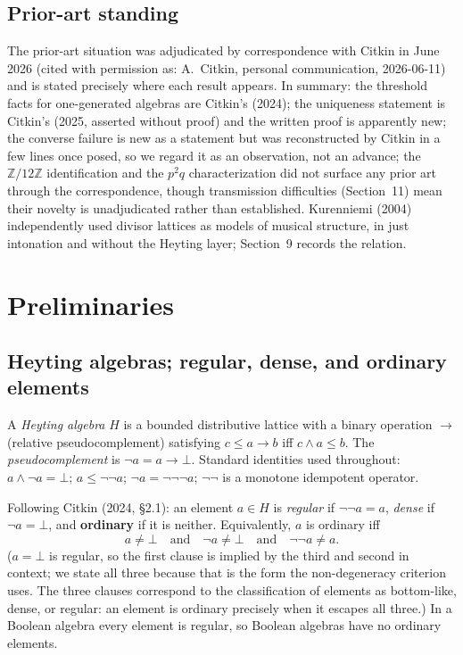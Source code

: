 ﻿\documentclass[11pt]{amsart}
\theoremstyle{plain}
\theoremstyle{definition}
\theoremstyle{remark}
\newcommand{\ZZ}{\mathbb{Z}}
\newcommand{\himp}{\to}          %
\begin{document}
\subsection*{Prior-art standing}
The prior-art situation was adjudicated by correspondence with Citkin in June
2026 (cited with permission as: A.~Citkin, personal communication, 2026-06-11)
and is stated precisely where each result appears. In summary: the threshold
facts for one-generated algebras are Citkin's (2024); the uniqueness statement
is Citkin's (2025, asserted without proof) and the written proof is apparently
new; the converse failure is new as a statement but was reconstructed by
Citkin in a few lines once posed, so we regard it as an observation, not an
advance; the $\ZZ/12\ZZ$ identification and the $p^2 q$ characterization did
not surface any prior art through the correspondence, though transmission
difficulties (Section~11) mean their novelty is unadjudicated rather than
established. Kurenniemi (2004) independently used divisor lattices as models
of musical structure, in just intonation and without the Heyting layer;
Section~9 records the relation.

\section{Preliminaries}

\subsection{Heyting algebras; regular, dense, and ordinary elements}

A \emph{Heyting algebra} $H$ is a bounded distributive lattice with a binary
operation $\himp$ (relative pseudocomplement) satisfying
$c \le a \himp b$ iff $c \wedge a \le b$. The \emph{pseudocomplement} is
$\neg a = a \himp \bot$. Standard identities used throughout:
$a \wedge \neg a = \bot$; $a \le \neg\neg a$; $\neg a = \neg\neg\neg a$;
$\neg\neg$ is a monotone idempotent operator.

Following Citkin (2024, \S2.1): an element $a \in H$ is \emph{regular} if
$\neg\neg a = a$, \emph{dense} if $\neg a = \bot$, and \textbf{ordinary} if it
is neither. Equivalently, $a$ is ordinary iff
\[
a \ne \bot \quad\text{and}\quad \neg a \ne \bot \quad\text{and}\quad
\neg\neg a \ne a.
\]
($a = \bot$ is regular, so the first clause is implied by the third and second
in context; we state all three because that is the form the non-degeneracy
criterion uses. The three clauses correspond to the classification of elements
as bottom-like, dense, or regular: an element is ordinary precisely when it
escapes all three.) In a Boolean algebra every element is regular, so Boolean
algebras have no ordinary elements.
\end{document}
